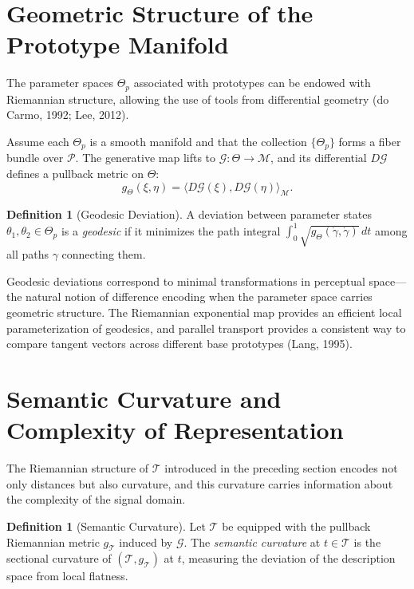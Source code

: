 \documentclass[11pt,a4paper]{article}
\theoremstyle{definition}
\newtheorem{definition}[theorem]{Definition}
\theoremstyle{remark}
\begin{document}
\section{Geometric Structure of the Prototype Manifold}
\label{sec:geometry}

The parameter spaces $\Theta_p$ associated with prototypes can be endowed with Riemannian structure, allowing the use of tools from differential geometry (do Carmo, 1992; Lee, 2012).

Assume each $\Theta_p$ is a smooth manifold and that the collection $\{\Theta_p\}$ forms a fiber bundle over $\mathcal{P}$. The generative map lifts to $\mathcal{G} : \Theta \to \mathcal{M}$, and its differential $D\mathcal{G}$ defines a pullback metric on $\Theta$:
\[
g_\Theta(\xi, \eta) = \langle D\mathcal{G}(\xi), D\mathcal{G}(\eta) \rangle_{\mathcal{M}}.
\]

\begin{definition}[Geodesic Deviation]
A deviation between parameter states $\theta_1, \theta_2 \in \Theta_p$ is a \emph{geodesic} if it minimizes the path integral $\int_0^1 \sqrt{g_\Theta(\dot{\gamma}, \dot{\gamma})} \, dt$ among all paths $\gamma$ connecting them.
\end{definition}

Geodesic deviations correspond to minimal transformations in perceptual space---the natural notion of difference encoding when the parameter space carries geometric structure. The Riemannian exponential map provides an efficient local parameterization of geodesics, and parallel transport provides a consistent way to compare tangent vectors across different base prototypes (Lang, 1995).

\section{Semantic Curvature and Complexity of Representation}
\label{sec:curvature}

The Riemannian structure of $\mathcal{T}$ introduced in the preceding section encodes not only distances but also curvature, and this curvature carries information about the complexity of the signal domain.

\begin{definition}[Semantic Curvature]
Let $\mathcal{T}$ be equipped with the pullback Riemannian metric $g_\mathcal{T}$ induced by $\mathcal{G}$. The \emph{semantic curvature} at $t \in \mathcal{T}$ is the sectional curvature of $(\mathcal{T}, g_\mathcal{T})$ at $t$, measuring the deviation of the description space from local flatness.
\end{definition}
\end{document}
